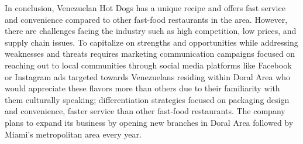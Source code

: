 In conclusion, Venezuelan Hot Dogs has a unique recipe and offers fast service and convenience compared to other fast-food restaurants in the area. However, there are challenges facing the industry such as high competition, low prices, and supply chain issues. To capitalize on strengths and opportunities while addressing weaknesses and threats requires marketing communication campaigns focused on reaching out to local communities through social media platforms like Facebook or Instagram ads targeted towards Venezuelans residing within Doral Area who would appreciate these flavors more than others due to their familiarity with them culturally speaking; differentiation strategies focused on packaging design and convenience, faster service than other fast-food restaurants. The company plans to expand its business by opening new branches in Doral Area followed by Miami's metropolitan area every year.
